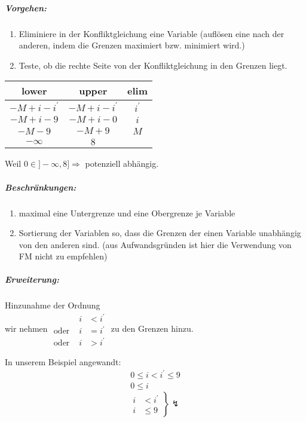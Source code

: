\subparagraph{Vorgehen:}
\begin{enumerate}
\item Eliminiere in der Konfliktgleichung eine Variable (auflösen eine nach der anderen, indem die Grenzen maximiert bzw. minimiert wird.)
\item Teste, ob die rechte Seite von der Konfliktgleichung in den Grenzen liegt.
\end{enumerate}
\begin{center}
\begin{tabular}{c|c|c}
lower & upper & elim \\
\hline
\( -M + i - i^\prime \) & \( -M+i-i^\prime\) & \(i^\prime \) \\
\hline
\( -M+ i - 9 \) & \( -M + i -0 \) & \( i \) \\
\hline
\(-M -9 \) & \( -M +9 \) & \( M \) \\
\hline
\( -\infty \) & \(8\) & \\
\end{tabular}
\end{center}

Weil \( 0 \in ] - \infty, 8 ] \Rightarrow \) potenziell abhängig.

\subparagraph{Beschränkungen:}
\begin{enumerate}
	\item maximal eine Untergrenze und eine Obergrenze je Variable
	\item Sortierung der Variablen so, dass die Grenzen der einen Variable unabhängig von den anderen sind. (aus Aufwandsgründen ist hier die Verwendung von FM nicht zu empfehlen)
\end{enumerate}

\subparagraph{Erweiterung:} Hinzunahme der Ordnung\\
wir nehmen $\begin{array}{lll}
             & i & < i^\prime \\
\text{oder } & i & = i^\prime \\
\text{oder } & i & > i^\prime
\end{array}$ zu den Grenzen hinzu.

In unserem Beispiel angewandt:
\begin{align*}
0 \leq i < i^\prime  \leq 9 \\
0 \leq i
\end{align*}
\[
\left.
\begin{array}{cc}
i & < i^\prime \\
i & \leq  9
\end{array}
\right \} \lightning
\]

